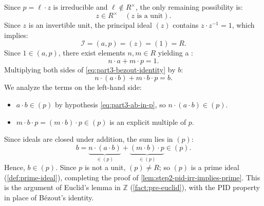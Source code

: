 \begin{proofWrapper}
\begin{content}
Since $p = \ell \cdot z$ is irreducible and $\ell \notin R^\times$, the only remaining possibility is:
\begin{equation}\label{eq:part3-z-is-unit}
z \in R^\times \quad (z \text{ is a unit}).
\end{equation}
Since $z$ is an invertible unit, the principal ideal $(z)$ contains $z \cdot z^{-1} = 1$, which implies:
\begin{equation}\label{eq:part3-ideal-unit}
\mathcal{I} = (a, p) = (z) = (1) = R.
\end{equation}
Since $1 \in (a, p)$, there exist elements $n, m \in R$ yielding a :
\begin{equation}\label{eq:part3-bezout-identity}
n \cdot a + m \cdot p = 1.
\end{equation}
Multiplying both sides of \eqref{eq:part3-bezout-identity} by $b$:
\begin{equation}\label{eq:part3-multiply-b}
n \cdot (a \cdot b) + m \cdot b \cdot p = b.
\end{equation}
We analyze the terms on the left-hand side:
\begin{itemize}
    \item $a \cdot b \in (p)$ by hypothesis \eqref{eq:part3-ab-in-p}, so $n \cdot (a \cdot b) \in (p)$.
    \item $m \cdot b \cdot p = (m \cdot b) \cdot p \in (p)$ is an explicit multiple of $p$.
\end{itemize}
Since ideals are closed under addition, the sum lies in $(p)$:
\begin{equation}\label{eq:part3-b-in-p-final}
b = \underbrace{n \cdot (a \cdot b)}_{\in (p)} + \underbrace{(m \cdot b) \cdot p}_{\in (p)} \in (p).
\end{equation}
Hence, $b \in (p)$. Since $p$ is not a unit, $(p) \neq R$; so $(p)$ is a prime ideal (\cref{def:prime-ideal}), completing the proof of \cref{lem:step2-pid-irr-implies-prime}. This is the argument of Euclid's lemma in $\mathbb{Z}$ (\cref{fact:pre-euclid}), with the PID property in place of Bézout's identity.
\end{content}
\end{proofWrapper}


